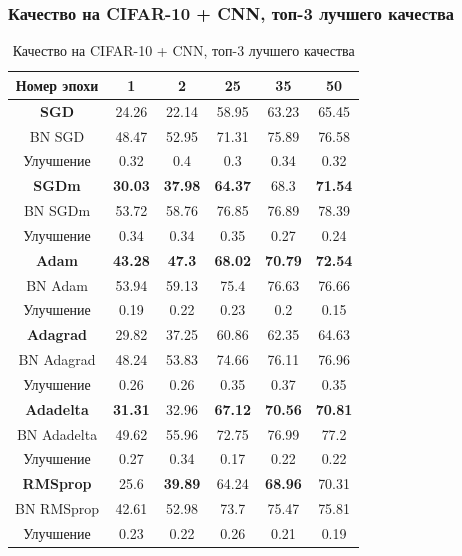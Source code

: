 \documentclass{beamer}
\begin{document}
\begin{frame}
	\frametitle{\footnotesize Качество на CIFAR-10 + CNN, топ-3 лучшего качества}
\begin{table}
\centering
\scriptsize
\begin{tabular}{|c|c|c|c|c|c|}\hline
Номер эпохи & 1 & 2 & 25 & 35 & 50 \\\hline \hline
\textbf{SGD} & 24.26 & 22.14 & 58.95 & 63.23 & 65.45 \\\hline
BN SGD & 48.47 & 52.95 & 71.31 & 75.89 & 76.58 \\\hline
Улучшение & 0.32 & 0.4 & 0.3 & 0.34 & 0.32 \\\hline\hline
\textbf{SGDm} & \color{green}\textbf{30.03} & \color{green}\textbf{37.98} & \color{green}\textbf{64.37} & 68.3 & \color{green}\textbf{71.54} \\\hline 
BN SGDm & 53.72 & 58.76 & 76.85 & 76.89 & 78.39 \\\hline
Улучшение & 0.34 & 0.34 & 0.35 & 0.27 & 0.24 \\\hline\hline
\color{red}\textbf{Adam} & \color{green}\textbf{43.28} &\color{green}\textbf{47.3} & \color{green}\textbf{68.02} & \color{green}\textbf{70.79} & \color{green}\textbf{72.54} \\\hline
BN Adam & 53.94 & 59.13 & 75.4 & 76.63 & 76.66 \\\hline
Улучшение & 0.19 & 0.22 & 0.23 & 0.2 & 0.15 \\\hline\hline
\textbf{Adagrad} & 29.82 & 37.25 & 60.86 & 62.35 & 64.63 \\\hline
BN Adagrad & 48.24 & 53.83 & 74.66 & 76.11 & 76.96 \\\hline
Улучшение & 0.26 & 0.26 & 0.35 & 0.37 & 0.35 \\\hline\hline
\color{red}\textbf{Adadelta} & \color{green}\textbf{31.31} & 32.96 & \color{green}\textbf{67.12} & \color{green}\textbf{70.56} & \color{green}\textbf{70.81} \\\hline
BN Adadelta & 49.62 & 55.96 & 72.75 & 76.99 & 77.2 \\\hline
Улучшение & 0.27 & 0.34 & 0.17 & 0.22 & 0.22 \\\hline\hline
\color{red}\textbf{RMSprop} & 25.6 & \color{green}\textbf{39.89} & 64.24 & \color{green}\textbf{68.96} & 70.31 \\\hline
BN RMSprop & 42.61 & 52.98 & 73.7 & 75.47 & 75.81 \\\hline
Улучшение & 0.23 & 0.22 & 0.26 & 0.21 & 0.19 \\\hline
\end{tabular}
\caption{\scriptsize Качество на CIFAR-10 + CNN, топ-3 лучшего качества}
\end{table}
\end{frame}
\end{document}
